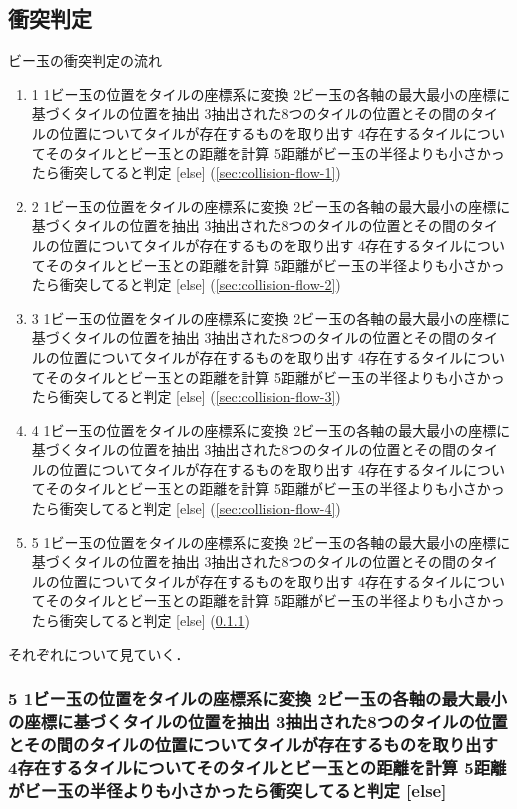 
{%
\makeatletter

\newcommand{\sec@collision@flow}[1]{%
  \stringcases
    {#1}%
    {%
      {1}{ビー玉の位置をタイルの座標系に変換}%
      {2}{ビー玉の各軸の最大最小の座標に基づくタイルの位置を抽出}%
      {3}{抽出された8つのタイルの位置とその間のタイルの位置についてタイルが存在するものを取り出す}%
      {4}{存在するタイルについてそのタイルとビー玉との距離を計算}%
      {5}{距離がビー玉の半径よりも小さかったら衝突してると判定}%
    }%
    {[else]}%
}

\newcommand{\e}{\bm{e}}

\newcommand{\e@x}{\e_x}
\newcommand{\e@y}{\e_y}
\newcommand{\e@z}{\e_z}

\newcommand{\e@tile}{\e^\prime}
\newcommand{\e@tile@x}{\e@tile_x}
\newcommand{\e@tile@y}{\e@tile_y}
\newcommand{\e@tile@z}{\e@tile_z}

\newcommand{\O@tile}{{\rm O}^\prime}
\newcommand{\x@tile}{x^\prime}
\newcommand{\y@tile}{y^\prime}
\newcommand{\z@tile}{z^\prime}

\newcommand{\v@O@tile}{\bm{v}_{\O@tile}}

\newcommand{\v@P}{\bm{v}_{\rm P}}
\newcommand{\v@tile@P}{\bm{v}^\prime_{\rm P}}
\subsection{衝突判定}

\begin{center}
  
\end{center}

ビー玉の衝突判定の流れ

\begin{enumerate}
  \item \sec@collision@flow{1} (\ref{sec:collision-flow-1})
  \item \sec@collision@flow{2} (\ref{sec:collision-flow-2})
  \item \sec@collision@flow{3} (\ref{sec:collision-flow-3})
  \item \sec@collision@flow{4} (\ref{sec:collision-flow-4})
  \item \sec@collision@flow{5} (\ref{sec:collision-flow-5})
\end{enumerate}

それぞれについて見ていく．







\subsubsection{\sec@collision@flow{5}}
\label{sec:collision-flow-5}

\makeatother
}
